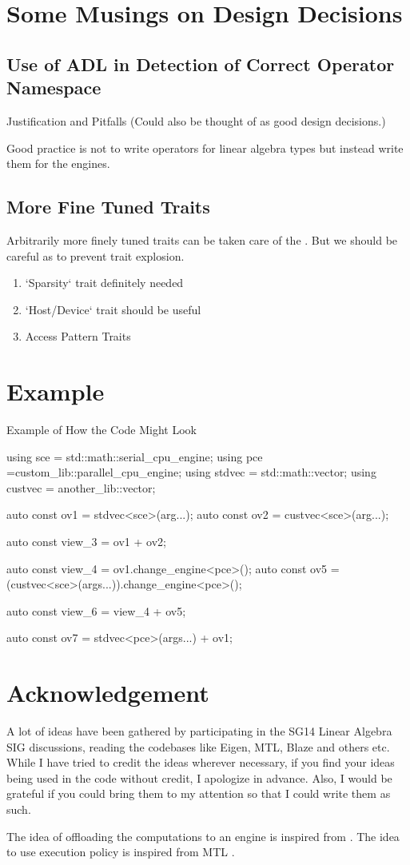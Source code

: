 \documentclass[oneside,11pt,a4paper]{jbarticle}
\begin{document}
\section{Some Musings on Design Decisions}
\subsection{Use of ADL in Detection of Correct Operator Namespace}
Justification and Pitfalls (Could also be thought of as good design decisions.)

Good practice is not to write operators for linear algebra types but instead
write them for the engines.
\subsection{More Fine Tuned Traits}
Arbitrarily more finely tuned traits can be taken care of the
.  But we should be careful as to prevent trait
explosion.
\begin{enumerate}
  \item  `Sparsity`  trait definitely needed
  \item  `Host/Device` trait should be useful
  \item  Access Pattern Traits
\end{enumerate}
\section{Example}

\begin{codecpp}{Example of How the Code Might Look}

  using sce = std::math::serial_cpu_engine;
  using pce =custom_lib::parallel_cpu_engine;
  using stdvec = std::math::vector;
  using custvec = another_lib::vector;

  auto const ov1 = stdvec<sce>(arg...);
  auto const ov2 = custvec<sce>(arg...);

  auto const view_3 = ov1 + ov2;

  auto const view_4 = ov1.change_engine<pce>();
  auto const ov5 = (custvec<sce>(args...)).change_engine<pce>();

  auto const view_6 = view_4 + ov5;

  auto const ov7 = stdvec<pce>(args...) + ov1;

\end{codecpp}
\section{Acknowledgement}
A lot of ideas have been gathered by participating in the SG14 Linear Algebra
SIG discussions, reading the codebases like Eigen, MTL, Blaze and others etc.
While I have tried to credit the ideas wherever necessary, if you find your
ideas being used in the code without credit, I apologize in advance. Also, I
would be grateful if you could bring them to my attention so that I could write
them as such.

The idea of offloading the computations to an engine is inspired from
\cite{GuyDavidson2019}. The idea to use execution policy is inspired from MTL
.


\printbibliography
\end{document}
